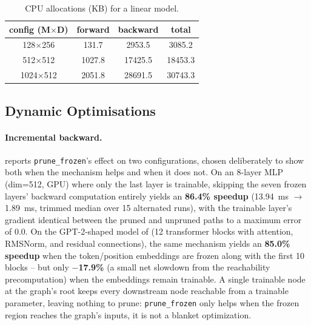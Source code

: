 \documentclass{article}
\begin{document}
\begin{table}[H]
\centering
\caption{CPU allocations (KB) for a linear model.}
\label{tab:linear_mem}
\begin{tabular}{c c c c}
\toprule
\textbf{config (M$\times$D)} & \textbf{forward} & \textbf{backward} & \textbf{total} \\
\midrule
128$\times$256 & 131.7 & 2953.5 & 3085.2 \\
512$\times$512 & 1027.8 & 17425.5 & 18453.3 \\
1024$\times$512 & 2051.8 & 28691.5 & 30743.3 \\
\bottomrule
\end{tabular}
\end{table}

\subsection{Dynamic Optimisations}
\paragraph{Incremental backward.}  reports \texttt{prune\_frozen}'s effect on two configurations, chosen deliberately to show both when the mechanism helps and when it does not. On an 8-layer MLP (dim=512, GPU) where only the last layer is trainable, skipping the seven frozen layers' backward computation entirely yields an \textbf{86.4\% speedup} (13.94~ms $\to$ 1.89~ms, trimmed median over 15 alternated runs), with the trainable layer's gradient identical between the pruned and unpruned paths to a maximum error of $0.0$. On the GPT-2-shaped model of  (12 transformer blocks with attention, RMSNorm, and residual connections), the same mechanism yields an \textbf{85.0\% speedup} when the token/position embeddings are frozen along with the first 10 blocks -- but only \textbf{$-$17.9\%} (a small net slowdown from the reachability precomputation) when the embeddings remain trainable. A single trainable node at the graph's root keeps every downstream node reachable from a trainable parameter, leaving nothing to prune: \texttt{prune\_frozen} only helps when the frozen region reaches the graph's inputs, it is not a blanket optimization.
\end{document}
